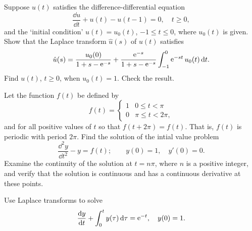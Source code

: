 {\begin{Exercise}
\end{Exercise}







\begin{Exercise}
  \label{exercise u'+u-u(t-1)=0}
  Suppose $u(t)$ satisfies the difference-differential equation
  \[
  \frac{\dd u}{\dd t} + u(t) - u(t-1) = 0, \quad t \geq 0,
  \]
  and the `initial condition' $u(t) = u_0(t)$, $-1 \leq t \leq 0$, where
  $u_0(t)$ is given.  Show that the Laplace transform $\hat{u}(s)$ of $u(t)$
  satisfies
  \[
  \hat{u}(s) = \frac{ u_0(0) }{ 1 + s - \mathop{\mathrm{e}}\nolimits^{-s} }
  + \frac{ \mathop{\mathrm{e}}\nolimits^{-s} }{ 1 + s - \mathop{\mathrm{e}}\nolimits^{-s} } \int_{-1}^0 \mathop{\mathrm{e}}\nolimits^{-s t} u_0(t) \,\mathrm{d} t.
  \]
  Find $u(t)$, $t \geq 0$, when $u_0(t) = 1$.  Check the result.

\end{Exercise}





\begin{Exercise}
  \label{exercise f(t)=1,0<t<pi}
  Let the function $f(t)$ be defined by
  \[
  f(t) = 
  \begin{cases}
    1 &0 \leq t < \pi \\
    0 &\pi \leq t < 2 \pi,
  \end{cases}
  \]
  and for all positive values of $t$ so that $f(t+2\pi) = f(t)$.  That is,
  $f(t)$ is periodic with period $2 \pi$.  Find the solution of the intial
  value problem
  \[
  \frac{\dd^2 y}{\dd t^2} - y = f(t); \qquad y(0) = 1, \quad y'(0) = 0.
  \]
  Examine the continuity of the solution at $t = n \pi$, where $n$ is a 
  positive integer, and verify that the solution is continuous and has a 
  continuous derivative at these points.

\end{Exercise}









\begin{Exercise}
  \label{exercise y' + int y = e-t}
  Use Laplace transforms to solve
  \[
  \frac{\mathrm{d} y}{\mathrm{d} t} + \int_0^t y(\tau) \,\mathrm{d} \tau = \mathop{\mathrm{e}}\nolimits^{-t},\quad y(0) = 1.
  \]


\end{Exercise}}
